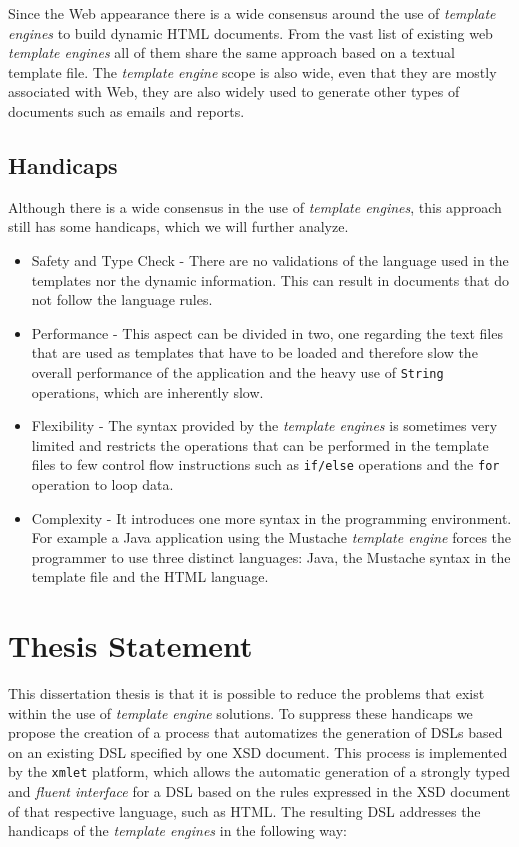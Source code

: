 \noindent
Since the Web appearance there is a wide consensus around the use of \textit{template engines} to build dynamic \ac{HTML} documents. From the vast list of existing web \textit{template engines}\cite{listtemplateengines} all of them share the same approach based on a textual template file. The \textit{template engine} scope is also wide, even that they are mostly associated with Web, they are also widely used to generate other types of documents such as emails and reports. 

\subsection{Handicaps}
\label{sec:templateengineshandicaps}

Although there is a wide consensus in the use of \textit{template engines}, this approach still has some handicaps, which we will further analyze.

\begin{itemize}
	\item Safety and Type Check - There are no validations of the language used in the templates nor the dynamic information. This can result in documents that do not follow the language rules.
	\item Performance - This aspect can be divided in two, one regarding the text files that are used as templates that have to be loaded and therefore slow the overall performance of the application and the heavy use of \texttt{String} operations, which are inherently slow.
	\item Flexibility - The syntax provided by the \textit{template engines} is sometimes very limited and restricts the operations that can be performed in the template files to few control flow instructions such as \texttt{if/else} operations and the \texttt{for} operation to loop data.
	\item Complexity - It introduces one more syntax in the programming environment. For example a Java application using the Mustache\cite{mustache} \textit{template engine} forces the programmer to use three distinct languages: Java, the Mustache syntax in the template file and the \ac{HTML} language.
\end{itemize}

\section{Thesis Statement}
\label{sec:thesisstatement}

This dissertation thesis is that it is possible to reduce the problems that exist within the use of \textit{template engine} solutions. To suppress these handicaps we propose the creation of a process that automatizes the generation of \ac{DSL}s based on an existing \ac{DSL} specified by one \ac{XSD} document. This process is implemented by the \texttt{xmlet} platform, which allows the automatic generation of a strongly typed and \textit{fluent interface} for a \ac{DSL} based on the rules expressed in the \ac{XSD} document of that respective language, such as \ac{HTML}. The resulting \ac{DSL} addresses the handicaps of the \textit{template engines} in the following way:

